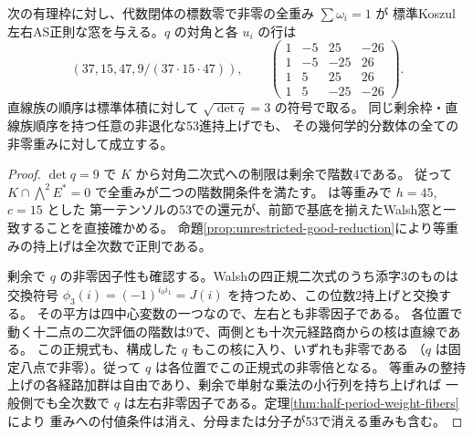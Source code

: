 \begin{corollary}\label{cor:half-period-rational-frame}
次の有理枠に対し、代数閉体の標数零で非零の全重み $\sum\omega_i=1$ が
標準Koszul左右AS正則な窓を与える。$q$ の対角と各 $u_i$ の行は
\[
 (37,15,47,9/(37\cdot15\cdot47)),\qquad
 \begin{pmatrix}
 1&-5&25&-26\\1&-5&-25&26\\1&5&25&26\\1&5&-25&-26
 \end{pmatrix}.
\]
直線族の順序は標準体積に対して $\sqrt{\det q}=3$ の符号で取る。
同じ剰余枠・直線族順序を持つ任意の非退化な53進持上げでも、
その幾何学的分数体の全ての非零重みに対して成立する。
\end{corollary}
\begin{proof}
$\det q=9$ で $K$ から対角二次式への制限は剰余で階数4である。
従って $K\cap \bigwedge^2E^*=0$ で全重みが二つの階数開条件を満たす。
 は等重みで $h=45$, $c=15$ とした
第一テンソルの53での還元が、前節で基底を揃えたWalsh窓と一致することを直接確かめる。
命題\ref{prop:unrestricted-good-reduction}により等重みの持上げは全次数で正則である。

剰余で $q$ の非零因子性も確認する。Walshの四正規二次式のうち添字3のものは
交換符号 $\phi_3(i)=(-1)^{i_0i_1}=J(i)$ を持つため、この位数2持上げと交換する。
その平方は四中心変数の一つなので、左右とも非零因子である。
各位置で動く十二点の二次評価の階数は9で、両側とも十次元経路商からの核は直線である。
この正規式も、構成した $q$ もこの核に入り、いずれも非零である
（$q$ は固定八点で非零）。従って $q$ は各位置でこの正規式の非零倍となる。
等重みの整持上げの各経路加群は自由であり、剰余で単射な乗法の小行列を持ち上げれば
一般側でも全次数で $q$ は左右非零因子である。定理\ref{thm:half-period-weight-fibers}により
重みへの付値条件は消え、分母または分子が53で消える重みも含む。
\end{proof}
